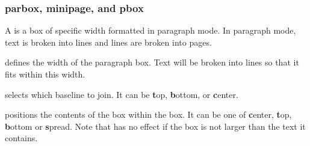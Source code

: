 \subsubsection{parbox, minipage, and pbox}
A  is a box of specific width formatted in paragraph mode. 
In paragraph mode, text is broken into lines and lines are broken into pages.

 defines the width of the paragraph box. Text will be broken 
into lines so that it fits within this width. 

 selects which baseline to join. It can be \textbf{t}op, \textbf{b}ottom,
or \textbf{c}enter. 

 positions the contents of the box within the box. It 
can be one of \textbf{c}enter, \textbf{t}op, \textbf{b}ottom or \textbf{s}pread. Note
that  has no effect if the box is not larger than the
text it contains.


